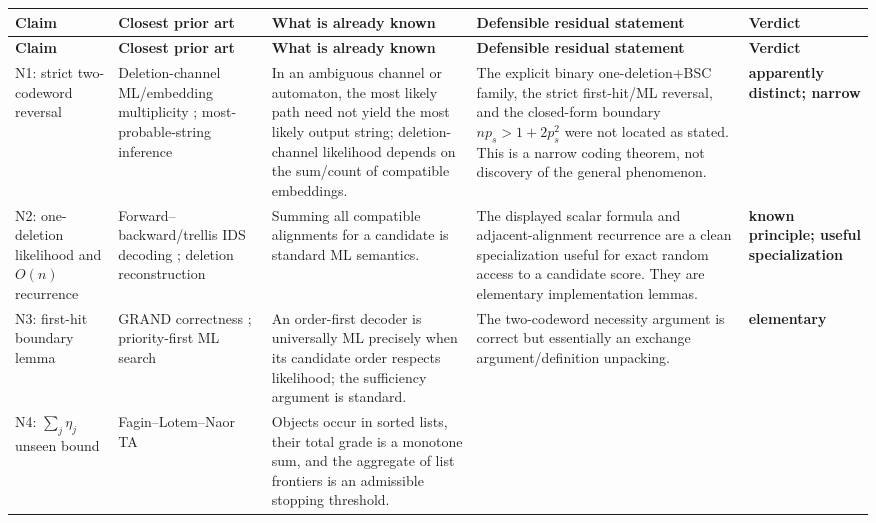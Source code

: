 \documentclass[11pt]{article}
\theoremstyle{definition}
\theoremstyle{remark}
\begin{document}
\footnotesize
\setlength{\tabcolsep}{2.5pt}
\begin{longtable}{@{}>{\raggedright\arraybackslash}p{}>{\raggedright\arraybackslash}p{}>{\raggedright\arraybackslash}p{}>{\raggedright\arraybackslash}p{}>{\raggedright\arraybackslash}p{}@{}}
\toprule
\textbf{Claim} & \textbf{Closest prior art} & \textbf{What is already known} & \textbf{Defensible residual statement} & \textbf{Verdict}\\
\midrule
\endfirsthead
\toprule
\textbf{Claim} & \textbf{Closest prior art} & \textbf{What is already known} & \textbf{Defensible residual statement} & \textbf{Verdict}\\
\midrule
\endhead
\bottomrule
\endfoot
N1: strict two-codeword reversal
& Deletion-channel ML/embedding multiplicity \cite{sabary2020ml,sriniv2021algorithms}; most-probable-string inference \cite{higuera2014mps}
& In an ambiguous channel or automaton, the most likely path need not yield the most likely output string; deletion-channel likelihood depends on the sum/count of compatible embeddings.
& The explicit binary one-deletion+BSC family, the strict first-hit/ML reversal, and the closed-form boundary $np_s>1+2p_s^2$ were not located as stated. This is a narrow coding theorem, not discovery of the general phenomenon.
& \textbf{apparently distinct; narrow}\\
\addlinespace
N2: one-deletion likelihood and $O(n)$ recurrence
& Forward--backward/trellis IDS decoding \cite{davey2001watermark,mansour2010conv}; deletion reconstruction \cite{sriniv2021algorithms}
& Summing all compatible alignments for a candidate is standard ML semantics.
& The displayed scalar formula and adjacent-alignment recurrence are a clean specialization useful for exact random access to a candidate score. They are elementary implementation lemmas.
& \textbf{known principle; useful specialization}\\
\addlinespace
N3: first-hit boundary lemma
& GRAND correctness \cite{duffy2019grand}; priority-first ML search \cite{han1993priority}
& An order-first decoder is universally ML precisely when its candidate order respects likelihood; the sufficiency argument is standard.
& The two-codeword necessity argument is correct but essentially an exchange argument/definition unpacking.
& \textbf{elementary}\\
\addlinespace
N4: $\sum_j\eta_j$ unseen bound
& Fagin--Lotem--Naor TA \cite{fagin2003ta}
& Objects occur in sorted lists, their total grade is a monotone sum, and the aggregate of list frontiers is an admissible stopping threshold.

\end{longtable}
\end{document}
